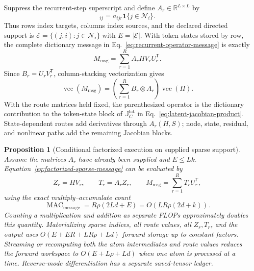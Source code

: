 \documentclass[10pt]{article}
\newtheorem{proposition}[theorem]{Proposition}
\theoremstyle{definition}
\theoremstyle{remark}
\begin{document}
Suppress the recurrent-step superscript and define
$A_r\in\mathbb R^{L\times L}$ by
\begin{equation}
[A_r]_{ij}
=a_{ijr}\mathbf1\{j\in\mathcal N_i\}.
\label{eq:target-source-sparse-route}
\end{equation}
Thus rows index targets, columns index sources, and the declared directed support is
$\mathcal E=\{(j,i):j\in\mathcal N_i\}$ with $E=|\mathcal E|$.  With token states stored by row,
the complete dictionary message in Eq.~\ref{eq:recurrent-operator-message} is exactly
\begin{equation}
M_{\mathrm{msg}}
=\sum_{r=1}^{R}A_rHV_rU_r^{\mathsf T}.
\label{eq:factorized-sparse-message}
\end{equation}
Since $B_r=U_rV_r^{\mathsf T}$, column-stacking vectorization gives
\begin{equation}
\operatorname{vec}(M_{\mathrm{msg}})
=\left(\sum_{r=1}^{R}B_r\otimes A_r\right)\operatorname{vec}(H).
\label{eq:dictionary-message-kronecker}
\end{equation}
With the route matrices held fixed, the parenthesized operator is the dictionary contribution to
the token-state block of $\mathbb J_C^{\mathrm{lat}}$ in
Eq.~\ref{eq:latent-jacobian-product}.  State-dependent routes add derivatives through $A_r(H,S)$;
node, state, residual, and nonlinear paths add the remaining Jacobian blocks.

\begin{proposition}[Conditional factorized execution on supplied sparse support]
\label{prop:factorized-sparse-execution}
Assume the matrices $A_r$ have already been supplied and $E\leq Lk$.
Equation~\ref{eq:factorized-sparse-message} can be evaluated by
\begin{equation}
Z_r=HV_r,
\qquad
T_r=A_rZ_r,
\qquad
M_{\mathrm{msg}}=\sum_{r=1}^{R}T_rU_r^{\mathsf T},
\label{eq:factorized-sparse-schedule}
\end{equation}
using the exact multiply--accumulate count
\begin{equation}
\operatorname{MAC}_{\mathrm{message}}
=R\rho(2Ld+E)
=O\!\left(LR\rho(2d+k)\right).
\label{eq:factorized-sparse-complexity}
\end{equation}
Counting a multiplication and addition as separate FLOPs approximately doubles this quantity.
Materializing sparse indices, all route values, all $Z_r,T_r$, and the output uses
$O(E+ER+LR\rho+Ld)$ forward storage up to constant factors.  Streaming or recomputing both the
atom intermediates and route values reduces the forward workspace to
$O(E+L\rho+Ld)$ when one atom is processed at a time.  Reverse-mode differentiation has a separate
saved-tensor ledger.
\end{proposition}
\end{document}
